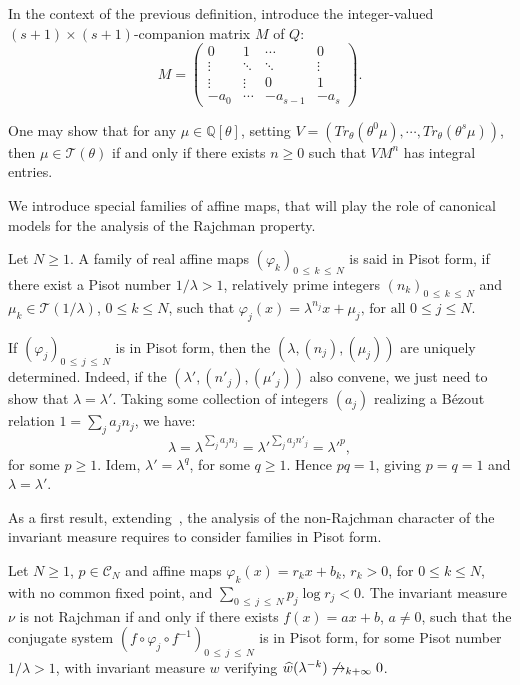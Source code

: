 \documentclass[AHL,Unicode,longabstracts,published]{cedram}
\newcommand{\Qbb}{\mathbb Q}
\newcommand{\Ccl}{\mathcal{C}}
\newcommand{\Tcl}{\mathcal{T}}
\let\oldhat\hat
\renewcommand*{\hat}[1]{\mathchoice{\widehat{#1}}{\widehat{#1}}{\oldhat{#1}}{\oldhat{#1}}}
\begin{document}
\begin{rema}
In the context of the previous definition, introduce the integer-valued $(s+1)\times(s+1)$-companion matrix $M$ of $Q$:
\[
M=\left(
\begin{matrix}
0&1&\cdots&0\\
\vdots&\ddots&\ddots&\vdots\\
\vdots&\vdots&0&1\\
-a_0&\cdots&-a_{s-1}&-a_s
\end{matrix}
\right).
\]


One may show that for any $\mu\in\Qbb[\theta]$, setting $V=(Tr_{\theta}(\theta^0\mu),\cdots,Tr_{\theta}(\theta^s\mu))$, then $\mu\in {\Tcl}(\theta)$ if and only if there exists $n\geq0$ such that $VM^n$ has integral entries.
\end{rema}

We introduce special families of affine maps, that will play the role of canonical models for the analysis of the Rajchman property.

\begin{defi}
Let $N\geq1$. A family of real affine maps $(\varphi_k)_{0\,\leq\,k\,\leq\,N}$ is said in Pisot form, if there exist a Pisot number $1/\lambda>1$, relatively prime integers $(n_k)_{0\,\leq\,k\,\leq\,N}$ and $\mu_k\in {\Tcl}(1/\lambda)$, $0\leq k\leq N$, such that $\varphi_j(x)=\lambda^{n_j}x+\mu_j\text{, for all }0\leq j\leq N$.
\end{defi}


\begin{rema}
If $(\varphi_j)_{0\,\leq\,j\,\leq\,N}$ is in Pisot form, then the $(\lambda,(n_j),(\mu_j))$ are uniquely determined. Indeed, if the $(\lambda',(n'_j),(\mu'_j))$ also convene, we just need to show that $\lambda=\lambda'$. Taking some collection of integers $(a_j)$ realizing a Bézout relation $1=\sum_j a_jn_j$, we have:
\[
\lambda=\lambda^{\sum_ja_jn_j}=\lambda'^{\sum_ja_jn'_j}=\lambda'^p,
\]
for some $p\geq1$. Idem, $\lambda'=\lambda^q$, for some $q\geq1$. Hence $pq=1$, giving $p=q=1$ and $\lambda=\lambda'$.
\end{rema}

As a first result, extending~\cite{salem}, the analysis of the non-Rajchman character of the invariant measure requires to consider families in Pisot form.

\begin{theo}\label{part1}
Let $N\geq 1$, $p\in{\Ccl}_N$ and affine maps $\varphi_k(x)=r_kx+b_k$, $r_k>0$, for $0\leq k\leq N$, with no common fixed point, and $\sum_{0\,\leq\,j\,\leq\,N}p_j\log r_j<0$. The invariant measure $\nu$ is not Rajchman if and only if there exists $f(x)=ax+b$, $a\not=0$, such that the conjugate system $(f\circ \varphi_j\circ f^{-1})_{0\,\leq\,j\,\leq\,N}$ is in Pisot form, for some Pisot number $1/\lambda>1$, with invariant measure $w$ verifying $\hat{w}(\lambda^{-k})\not\rightarrow_{k+\infty}0$.
\end{theo}
\end{document}
